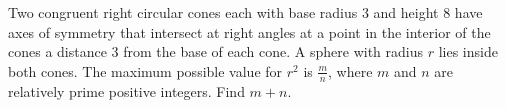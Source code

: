 Two congruent right circular cones each with base radius $3$ and height $8$ have axes of symmetry that intersect at right angles at a point in the interior of the cones a distance $3$ from the base of each cone. A sphere with radius $r$ lies inside both cones. The maximum possible value for $r^2$ is $\frac mn$, where $m$ and $n$ are relatively prime positive integers. Find $m+n$.